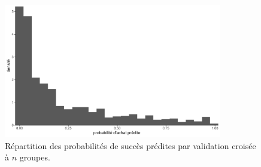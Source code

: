 \documentclass[
  11pt,
  letterpaper,
]{scrbook}
\theoremstyle{definition}
\theoremstyle{remark}
\begin{document}
\begin{figure}[ht!]

{\centering \includegraphics[width=0.85\textwidth,height=\textheight]{reglogistique_files/figure-pdf/fig-classification0-1.pdf}

}

\caption{\label{fig-classification0}Répartition des probabilités de
succès prédites par validation croisée à \(n\) groupes.}

\end{figure}
\end{document}
